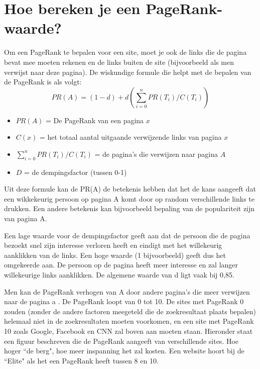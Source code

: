 \documentclass[12pt,a4paper]{article}
\begin{document}
\section{Hoe bereken je een PageRank-waarde?}
Om een PageRank te bepalen voor een site, moet je ook de links die de pagina bevat mee moeten rekenen en de links buiten de site (bijvoorbeeld als men verwijst naar deze pagina). De wiskundige formule die helpt met de bepalen van de PageRank is als volgt: 
\[PR(A) = (1 - d) + d(\sum_{i=0}^{n}PR(T_{i})/C(T_{i}))\]
\begin{itemize}
\item $PR(A)$ = De PageRank van een pagina $x$
\item $C(x)$ = het totaal aantal uitgaande verwijzende links van pagina $x$
\item $\sum_{i=0}^{n}PR(T_{i})/C(T_{i})$ = de pagina's die verwijzen naar pagina $A$
\item $D$ = de dempingsfactor (tussen 0-1)
\end{itemize}

Uit deze formule kan de PR(A) de betekenis hebben dat het de kans aangeeft dat een wikkekeurig persoon op pagina A komt door op random verschillende links te drukken. Een andere betekenis kan bijvoorbeeld bepaling van de populariteit zijn van pagina A. 
\vspace{1pc}

Een lage waarde voor de dempingsfactor geeft aan dat de persoon die de pagina bezoekt snel zijn interesse verloren heeft en eindigt met het willekeurig aanklikken van de links. Een hoge waarde (1 bijvoorbeeld) geeft dus het omgekeerde aan. De persoon op de pagina heeft meer interesse en zal langer willekeurige links aanklikken. De algemene waarde van d ligt vaak bij 0,85. 
\vspace{1pc}

Men kan de PageRank verhogen van A door andere pagina's die meer verwijzen naar de pagina a \cite{1}. De PageRank loopt van 0 tot 10. De sites met PageRank 0 zouden (zonder de andere factoren meegeteld die de zoekresultaat plaats bepalen) helemaal niet in de zoekresultaten moeten voorkomen, en een site met PageRank 10 zoals Google, Facebook en CNN zal boven aan moeten staan. Hieronder staat een figuur beschreven die de PageRank aangeeft van verschillende sites. Hoe hoger ``de berg", hoe meer inspanning het zal kosten. Een website hoort bij de ``Elite" als het een PageRank heeft tussen 8 en 10. \cite{3}
\end{document}
